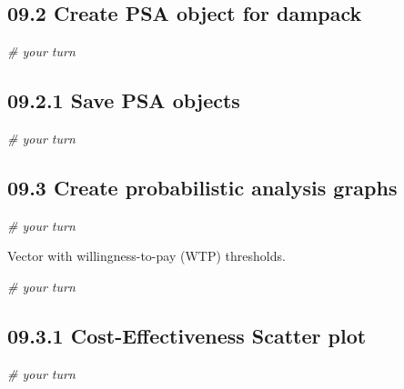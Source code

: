 \documentclass[
]{article}
\newenvironment{Shaded}{\begin{snugshade}}{\end{snugshade}}
\newcommand{\CommentTok}[1]{\textcolor[rgb]{0.56,0.35,0.01}{\textit{#1}}}
\begin{document}
\hypertarget{create-psa-object-for-dampack}{%
\subsection{09.2 Create PSA object for
dampack}\label{create-psa-object-for-dampack}}

\begin{Shaded}
\begin{Highlighting}[]
\CommentTok{# your turn}
\end{Highlighting}
\end{Shaded}

\hypertarget{save-psa-objects}{%
\subsection{09.2.1 Save PSA objects}\label{save-psa-objects}}

\begin{Shaded}
\begin{Highlighting}[]
\CommentTok{# your turn}
\end{Highlighting}
\end{Shaded}

\hypertarget{create-probabilistic-analysis-graphs}{%
\subsection{09.3 Create probabilistic analysis
graphs}\label{create-probabilistic-analysis-graphs}}

\begin{Shaded}
\begin{Highlighting}[]
\CommentTok{# your turn}
\end{Highlighting}
\end{Shaded}

Vector with willingness-to-pay (WTP) thresholds.

\begin{Shaded}
\begin{Highlighting}[]
\CommentTok{# your turn}
\end{Highlighting}
\end{Shaded}

\hypertarget{cost-effectiveness-scatter-plot}{%
\subsection{09.3.1 Cost-Effectiveness Scatter
plot}\label{cost-effectiveness-scatter-plot}}

\begin{Shaded}
\begin{Highlighting}[]
\CommentTok{# your turn}
\end{Highlighting}
\end{Shaded}
\end{document}
